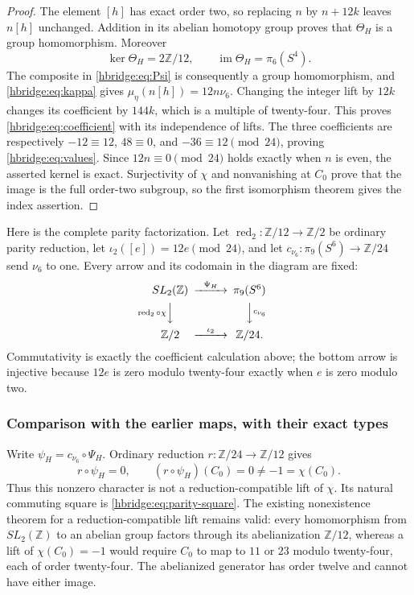 \documentclass[11pt]{article}
\theoremstyle{definition}
\begin{document}
\begin{proof}
The element \([h]\) has exact order two, so replacing \(n\)
by \(n+12k\) leaves \(n[h]\) unchanged. Addition in its
abelian homotopy group proves that \(\Theta_H\) is a group
homomorphism. Moreover
\[
\ker\Theta_H=2\mathbb Z/12,
\qquad \operatorname{im}\Theta_H=\pi_6(S^4).
\]
The composite in \eqref{hbridge:eq:Psi} is consequently a
group homomorphism, and \eqref{hbridge:eq:kappa} gives
\(\mu_\eta(n[h])=12n\nu_6\). Changing the integer lift by
\(12k\) changes its coefficient by \(144k\), which is a
multiple of twenty-four. This proves
\eqref{hbridge:eq:coefficient} with its independence of lifts.
The three coefficients are respectively
\(-12\equiv12\), \(48\equiv0\), and
\(-36\equiv12\pmod{24}\), proving
\eqref{hbridge:eq:values}. Since \(12n\equiv0\pmod{24}\)
holds exactly when \(n\) is even, the asserted kernel is exact.
Surjectivity of \(\chi\) and nonvanishing at \(C_0\) prove
that the image is the full order-two subgroup, so the first
isomorphism theorem gives the index assertion.
\end{proof}

Here is the complete parity factorization. Let
\(\operatorname{red}_2:\mathbb Z/12\to\mathbb Z/2\) be
ordinary parity reduction, let
\(\iota_2([e])=12e\pmod{24}\), and let
\(c_{\nu_6}:\pi_9(S^6)\to\mathbb Z/24\) send \(\nu_6\)
to one. Every arrow and its codomain in the diagram are fixed:
\begin{equation}
\begin{CD}
SL_2(\mathbb Z) @>{\Psi_H}>> \pi_9(S^6)\\
@V{\operatorname{red}_2\circ\chi}VV @VV{c_{\nu_6}}V\\
\mathbb Z/2 @>{\iota_2}>> \mathbb Z/24.
\end{CD}
\label{hbridge:eq:parity-square}
\end{equation}
Commutativity is exactly the coefficient calculation above; the
bottom arrow is injective because \(12e\) is zero modulo
twenty-four exactly when \(e\) is zero modulo two.

\subsubsection{Comparison with the earlier maps, with their exact types}

Write \(\psi_H=c_{\nu_6}\circ\Psi_H\). Ordinary reduction
\(r:\mathbb Z/24\to\mathbb Z/12\) gives
\begin{equation}
r\circ\psi_H=0,
\qquad (r\circ\psi_H)(C_0)=0\ne-1=\chi(C_0).
\label{hbridge:eq:not-lift}
\end{equation}
Thus this nonzero character is not a reduction-compatible lift of
\(\chi\). Its natural commuting square is
\eqref{hbridge:eq:parity-square}. The existing nonexistence
theorem for a reduction-compatible lift remains valid: every
homomorphism from \(SL_2(\mathbb Z)\) to an abelian group
factors through its abelianization \(\mathbb Z/12\), whereas
a lift of \(\chi(C_0)=-1\) would require \(C_0\) to map
to \(11\) or \(23\) modulo twenty-four, each of order
twenty-four. The abelianized generator has order twelve and
cannot have either image.
\end{document}
